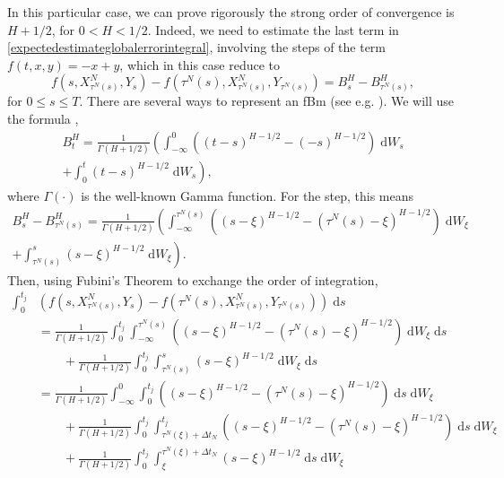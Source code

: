 \documentclass[reqno,12pt]{amsart}
\theoremstyle{plain}%
\theoremstyle{definition}
\begin{document}
In this particular case, we can prove rigorously the strong order of convergence is $H+1/2$, for $0 < H < 1/2$. Indeed, we need to estimate the last term in \eqref{expectedestimateglobalerrorintegral}, involving the steps of the term $f(t, x, y) = -x + y$, which in this case reduce to
\[
    f(s, X_{\tau^N(s)}^N, Y_s) - f(\tau^N(s), X_{\tau^N(s)}^N, Y_{\tau^N(s)}) = B^H_s - B^H_{\tau^N(s)},
\]
for $0 \leq s \leq T$. There are several ways to represent an fBm (see e.g. \cite{BHOB2008, Mishura2008}). We will use the formula \cite[eq. (2.1)]{MandelbrotVanNess1968}, \cite[eq. (1.1)]{BHOB2008}
\begin{multline}
    \label{BHtintegralformula}
    B^H_t = \frac{1}{\Gamma(H + 1/2)}\left(\int_{-\infty}^0 \left( (t-s)^{H-1/2} - (-s)^{H-1/2}\right) \;\mathrm{d}W_s \right. \\
    \left. + \int_0^t (t - s)^{H-1/2} \;\mathrm{d}W_s\right),
\end{multline}
where $\Gamma(\cdot)$ is the well-known Gamma function. For the step, this means
\begin{multline}
    \label{BHtintegralformulastep}
    B^H_s - B^H_{\tau^N(s)} = \frac{1}{\Gamma(H + 1/2)}\left(\int_{-\infty}^{\tau^N(s)} \left( (s-\xi)^{H-1/2} - (\tau^N(s)-\xi)^{H-1/2}\right) \;\mathrm{d}W_\xi \right. \\
    \left. + \int_{\tau^N(s)}^s (s - \xi)^{H-1/2} \;\mathrm{d}W_\xi\right).
\end{multline}
Then, using Fubini's Theorem to exchange the order of integration,
\begin{equation}
    \label{integralofstepfBm}
    \begin{aligned}
        \int_0^{t_j} & \left( f(s, X_{\tau^N(s)}^N, Y_s) - f(\tau^N(s), X_{\tau^N(s)}^N, Y_{\tau^N(s)}) \right)\;\mathrm{d}s \\
        & = \frac{1}{\Gamma(H + 1/2)}\int_0^{t_j} \int_{-\infty}^{\tau^N(s)} \left( (s-\xi)^{H-1/2} - (\tau^N(s)-\xi)^{H-1/2}\right) \;\mathrm{d}W_\xi \;\mathrm{d}s \\
        & \qquad + \frac{1}{\Gamma(H + 1/2)}\int_0^{t_j} \int_{\tau^N(s)}^s (s - \xi)^{H-1/2} \;\mathrm{d}W_\xi \;\mathrm{d}s \\
        & = \frac{1}{\Gamma(H + 1/2)}\int_{-\infty}^{0} \int_{0}^{t_j} \left( (s-\xi)^{H-1/2} - (\tau^N(s)-\xi)^{H-1/2}\right)  \;\mathrm{d}s \;\mathrm{d}W_\xi \\
        & \qquad + \frac{1}{\Gamma(H + 1/2)}\int_{0}^{t_j} \int_{\tau^N(\xi)+\Delta t_N}^{t_j} \left( (s-\xi)^{H-1/2} - (\tau^N(s)-\xi)^{H-1/2}\right)  \;\mathrm{d}s \;\mathrm{d}W_\xi\\
        & \qquad + \frac{1}{\Gamma(H + 1/2)}\int_0^{t_j} \int_\xi^{\tau^N(\xi) + \Delta t_N} (s - \xi)^{H-1/2} \;\mathrm{d}s \;\mathrm{d}W_\xi \\
    \end{aligned}
\end{equation}
\end{document}

